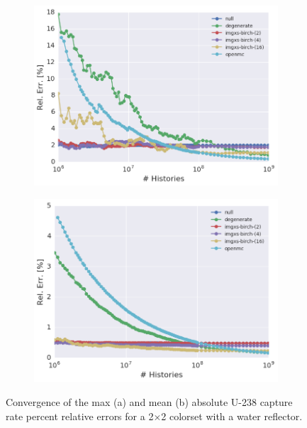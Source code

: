 \begin{figure}[h!]
\centering
\begin{subfigure}{\textwidth}
  \centering
  \includegraphics[width=0.9\linewidth]{figures/results/convergence/reflector/max-capt-err-evo}
  \caption{}
  \label{fig:chap11-refl-capture-converge-max}
\end{subfigure}
\begin{subfigure}{\textwidth}
  \centering
  \includegraphics[width=0.9\linewidth]{figures/results/convergence/reflector/mean-capt-err-evo}
  \caption{}
  \label{fig:chap11-refl-capture-converge-mean}
\end{subfigure}
\vspace{2mm}
\caption[Fission rate covergence for a 2$\times$2 colorset with reflector]{Convergence of the max (a) and mean (b) absolute U-238 capture rate percent relative errors for a 2$\times$2 colorset with a water reflector.}
\label{fig:chap11-refl-capture-converge}
\end{figure}

